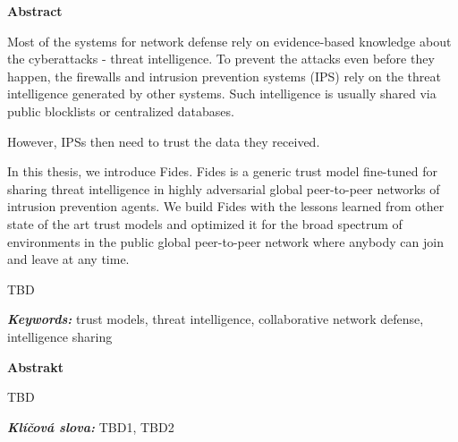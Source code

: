 \newenvironment{abstractpage}
  {\cleardoublepage\thispagestyle{empty}}
  {\vfill\cleardoublepage}
\newenvironment{abstract}[1]
  {\bigskip
   \begin{center}\bfseries#1\end{center}\small\leftskip=0.5cm\rightskip=0.5cm}
  {\par\bigskip}

\providecommand{\keywords}[2]{\footnotesize\textbf{\textit{#1:}} #2}

\begin{abstractpage}
\begin{abstract}{Abstract}

Most of the systems for network defense rely on evidence-based knowledge about the cyberattacks - threat intelligence. To prevent the attacks even before they happen, the firewalls and intrusion prevention systems (IPS) rely on the threat intelligence generated by other systems.
Such intelligence is usually shared via public blocklists or centralized databases. 


However, IPSs then need to trust the data they received.

In this thesis, we introduce Fides. Fides is a generic trust model fine-tuned for sharing threat intelligence in highly adversarial global peer-to-peer networks of intrusion prevention agents.
We build Fides with the lessons learned from other state of the art trust models and optimized it for the broad spectrum of environments in the public global peer-to-peer network where anybody can join and leave at any time.



%  
TBD 
\end{abstract}

\keywords{Keywords}{trust models, threat intelligence, collaborative network defense, intelligence sharing}

\vspace*{\fill}

\begin{abstract}{Abstrakt}
    TBD 
    
\end{abstract}
\keywords{Klíčová slova}{TBD1, TBD2} 

\end{abstractpage}
\thispagestyle{empty}

\cleardoublepage